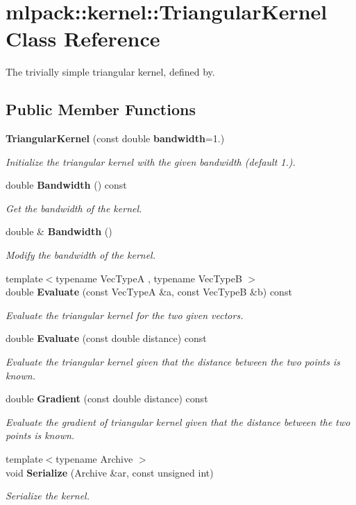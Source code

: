 \section{mlpack\+:\+:kernel\+:\+:Triangular\+Kernel Class Reference}
\label{classmlpack_1_1kernel_1_1TriangularKernel}


The trivially simple triangular kernel, defined by.  


\subsection*{Public Member Functions}
\begin{DoxyCompactItemize}
\item 
{\bf Triangular\+Kernel} (const double {\bf bandwidth}=1.)
\begin{DoxyCompactList}\small\item\em Initialize the triangular kernel with the given bandwidth (default 1.). \end{DoxyCompactList}\item 
double {\bf Bandwidth} () const 
\begin{DoxyCompactList}\small\item\em Get the bandwidth of the kernel. \end{DoxyCompactList}\item 
double \& {\bf Bandwidth} ()
\begin{DoxyCompactList}\small\item\em Modify the bandwidth of the kernel. \end{DoxyCompactList}\item 
{\footnotesize template$<$typename Vec\+TypeA , typename Vec\+TypeB $>$ }\\double {\bf Evaluate} (const Vec\+TypeA \&a, const Vec\+TypeB \&b) const 
\begin{DoxyCompactList}\small\item\em Evaluate the triangular kernel for the two given vectors. \end{DoxyCompactList}\item 
double {\bf Evaluate} (const double distance) const 
\begin{DoxyCompactList}\small\item\em Evaluate the triangular kernel given that the distance between the two points is known. \end{DoxyCompactList}\item 
double {\bf Gradient} (const double distance) const 
\begin{DoxyCompactList}\small\item\em Evaluate the gradient of triangular kernel given that the distance between the two points is known. \end{DoxyCompactList}\item 
{\footnotesize template$<$typename Archive $>$ }\\void {\bf Serialize} (Archive \&ar, const unsigned int)
\begin{DoxyCompactList}\small\item\em Serialize the kernel. \end{DoxyCompactList}\end{DoxyCompactItemize}
